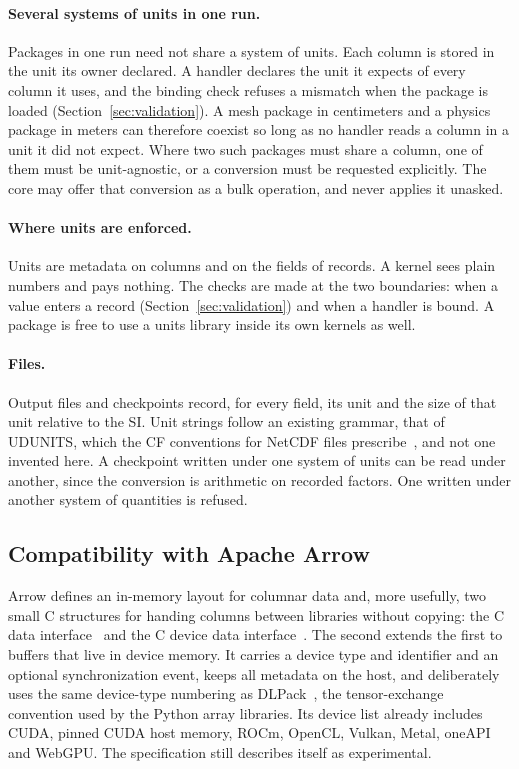 \documentclass[11pt,a4paper]{article}
\begin{document}
\paragraph{Several systems of units in one run.}  Packages in one run need
not share a system of units.  Each column is stored in the unit its owner
declared.  A handler declares the unit it expects of every column it uses,
and the binding check refuses a mismatch when the package is loaded
(Section~\ref{sec:validation}).  A mesh package in centimeters and a physics
package in meters can therefore coexist so long as no handler reads a column
in a unit it did not expect.  Where two such packages must share a column,
one of them must be unit-agnostic, or a conversion must be requested
explicitly.  The core may offer that conversion as a bulk operation, and
never applies it unasked.

\paragraph{Where units are enforced.}  Units are metadata on columns and on
the fields of records.  A kernel sees plain numbers and pays nothing.  The
checks are made at the two boundaries: when a value enters a record
(Section~\ref{sec:validation}) and when a handler is bound.  A package is
free to use a units library inside its own kernels as well.

\paragraph{Files.}  Output files and checkpoints record, for every field,
its unit and the size of that unit relative to the SI.  Unit strings follow
an existing grammar, that of UDUNITS, which the CF conventions for NetCDF
files prescribe~\cite{cfconventions}, and not one invented here.  A
checkpoint written under one system of units can be read under another,
since the conversion is arithmetic on recorded factors.  One written under
another system of quantities is refused.

\subsection{Compatibility with Apache Arrow}

Arrow defines an in-memory layout for columnar data and, more usefully, two
small C structures for handing columns between libraries without copying: the
C data interface~\cite{arrowcdata} and the C device data
interface~\cite{arrowcdevice}.  The second extends the first to buffers that
live in device memory.  It carries a device type and identifier and an
optional synchronization event, keeps all metadata on the host, and
deliberately uses the same device-type numbering as DLPack~\cite{dlpack}, the
tensor-exchange convention used by the Python array libraries.  Its device
list already includes CUDA, pinned CUDA host memory, ROCm, OpenCL, Vulkan,
Metal, oneAPI and WebGPU.  The specification still describes itself as
experimental.
\end{document}
